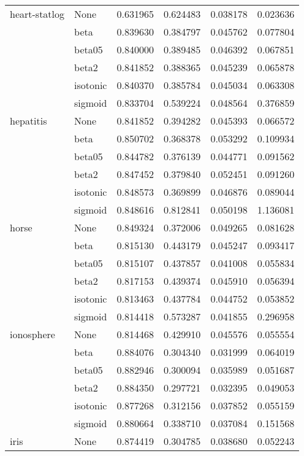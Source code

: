 \begin{tabular}{llrrrr}
heart-statlog & None &  0.631965 &  0.624483 &  0.038178 &  0.023636 \\
        & beta &  0.839630 &  0.384797 &  0.045762 &  0.077804 \\
        & beta05 &  0.840000 &  0.389485 &  0.046392 &  0.067851 \\
        & beta2 &  0.841852 &  0.388365 &  0.045239 &  0.065878 \\
        & isotonic &  0.840370 &  0.385784 &  0.045034 &  0.063308 \\
        & sigmoid &  0.833704 &  0.539224 &  0.048564 &  0.376859 \\
hepatitis & None &  0.841852 &  0.394282 &  0.045393 &  0.066572 \\
        & beta &  0.850702 &  0.368378 &  0.053292 &  0.109934 \\
        & beta05 &  0.844782 &  0.376139 &  0.044771 &  0.091562 \\
        & beta2 &  0.847452 &  0.379840 &  0.052451 &  0.091260 \\
        & isotonic &  0.848573 &  0.369899 &  0.046876 &  0.089044 \\
        & sigmoid &  0.848616 &  0.812841 &  0.050198 &  1.136081 \\
horse & None &  0.849324 &  0.372006 &  0.049265 &  0.081628 \\
        & beta &  0.815130 &  0.443179 &  0.045247 &  0.093417 \\
        & beta05 &  0.815107 &  0.437857 &  0.041008 &  0.055834 \\
        & beta2 &  0.817153 &  0.439374 &  0.045910 &  0.056394 \\
        & isotonic &  0.813463 &  0.437784 &  0.044752 &  0.053852 \\
        & sigmoid &  0.814418 &  0.573287 &  0.041855 &  0.296958 \\
ionosphere & None &  0.814468 &  0.429910 &  0.045576 &  0.055554 \\
        & beta &  0.884076 &  0.304340 &  0.031999 &  0.064019 \\
        & beta05 &  0.882946 &  0.300094 &  0.035989 &  0.051687 \\
        & beta2 &  0.884350 &  0.297721 &  0.032395 &  0.049053 \\
        & isotonic &  0.877268 &  0.312156 &  0.037852 &  0.055159 \\
        & sigmoid &  0.880664 &  0.338710 &  0.037084 &  0.151568 \\
iris & None &  0.874419 &  0.304785 &  0.038680 &  0.052243 \\

\end{tabular}
